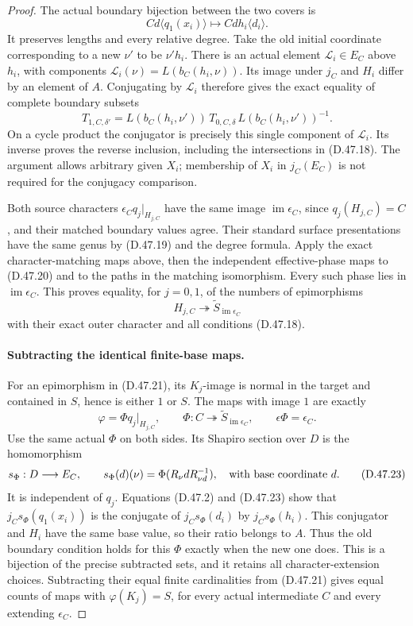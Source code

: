 \begin{proof}
The actual boundary bijection between the two covers is
\[
 C d\langle q_1(x_i)\rangle
              \longmapsto C d h_i\langle d_i\rangle.
 \tag{D.47.19}
\]
It preserves lengths and every relative degree.
Take the old initial coordinate corresponding to a new
\(\nu'\) to be \(\nu'h_i\).
There is an actual element \(\mathcal L_i\in E_C\)
above \(h_i\), with components
\(\mathcal L_i(\nu)=L(b_C(h_i,\nu))\).
Its image under \(j_C\) and \(H_i\) differ by an element
of \(A\). Conjugating by \(\mathcal L_i\) therefore gives
the exact equality of complete boundary subsets
\[
 T_{1,C,\delta'}=
 L(b_C(h_i,\nu'))\,T_{0,C,\delta}\,L(b_C(h_i,\nu'))^{-1}.
 \tag{D.47.20}
\]
On a cycle product the conjugator is precisely this single
component of \(\mathcal L_i\). Its inverse proves the
reverse inclusion, including the intersections in
\textup{(D.47.18)}. The argument allows arbitrary given
\(X_i\); membership of \(X_i\) in \(j_C(E_C)\) is not
required for the conjugacy comparison.

Both source characters \(\epsilon_Cq_j|_{H_{j,C}}\)
have the same image \(\operatorname{im}\epsilon_C\),
since \(q_j(H_{j,C})=C\), and their matched boundary
values agree. Their standard surface presentations have
the same genus by \textup{(D.47.19)} and the degree formula.
Apply the exact character-matching maps above, then the
independent effective-phase maps to \textup{(D.47.20)}
and to the paths in the matching isomorphism.
Every such phase lies in \(\operatorname{im}\epsilon_C\).
This proves equality, for \(j=0,1\), of the numbers of
epimorphisms
\[
 H_{j,C}\twoheadrightarrow
         \widetilde S_{\operatorname{im}\epsilon_C}
 \tag{D.47.21}
\]
with their exact outer character and all conditions
\textup{(D.47.18)}.

\paragraph{Subtracting the identical finite-base maps.}
For an epimorphism in \textup{(D.47.21)}, its \(K_j\)-image
is normal in the target and contained in \(S\), hence is
either \(1\) or \(S\). The maps with image \(1\) are
exactly
\[
 \varphi=\Phi q_j|_{H_{j,C}},\qquad
 \Phi:C\twoheadrightarrow\widetilde S_{\operatorname{im}\epsilon_C},
                  \qquad\epsilon\Phi=\epsilon_C.
 \tag{D.47.22}
\]
Use the same actual \(\Phi\) on both sides. Its Shapiro
section over \(D\) is the homomorphism
\[
 s_\Phi:D\longrightarrow E_C,\qquad
 s_\Phi(d)(\nu)=\Phi(R_\nu dR_{\nu d}^{-1}),
               \quad\hbox{with base coordinate }d.
 \tag{D.47.23}
\]
It is independent of \(q_j\). Equations
\textup{(D.47.2)} and \textup{(D.47.23)} show that
\(j_Cs_\Phi(q_1(x_i))\) is the conjugate of
\(j_Cs_\Phi(d_i)\) by \(j_Cs_\Phi(h_i)\).
This conjugator and \(H_i\) have the same base value,
so their ratio belongs to \(A\). Thus the old boundary
condition holds for this \(\Phi\) exactly when the new
one does. This is a bijection of the precise subtracted
sets, and it retains all character-extension choices.
Subtracting their equal finite cardinalities from
\textup{(D.47.21)} gives equal counts of maps with
\(\varphi(K_j)=S\), for every actual intermediate
\(C\) and every extending \(\epsilon_C\).


\end{proof}
